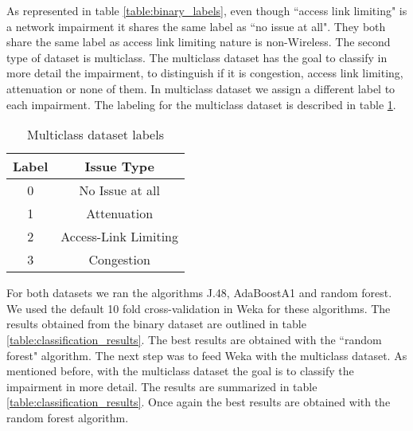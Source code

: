 As represented in table \ref{table:binary_labels}, even though ``access link limiting" is a network impairment it shares the same label as ``no issue at all". They both share the same label as access link limiting nature is non-Wireless.
The second type of dataset is multiclass. The multiclass dataset has the goal to classify in more detail the impairment, to distinguish if it is congestion, access link limiting, attenuation or none of them. In multiclass dataset we assign a different label to each impairment. The labeling for the multiclass dataset is described in table \ref{table:multiclass_labels}.

\begin{table}[H]
	\begin{center}
		\begin{tabular}{||c c||} 
			\hline
			Label & Issue Type\\ [0.5ex] 
			\hline\hline
			0 & No Issue at all \\ 
			\hline
			1 & Attenuation\\
			\hline
			2 & Access-Link Limiting \\
			\hline
			3 & Congestion \\[1ex] 
			\hline
		\end{tabular}
		\caption{Multiclass dataset labels}
		\label{table:multiclass_labels}
	\end{center}
\end{table}

For both datasets we ran the algorithms J.48, AdaBoostA1 and random forest. We used the default 10 fold cross-validation in Weka for these algorithms. The results obtained from the binary dataset are outlined in table \ref{table:classification_results}. The best results are obtained with the ``random forest" algorithm. The next step was to feed Weka with the multiclass dataset. As mentioned before, with the multiclass dataset the goal is to classify the impairment in more detail. The results are summarized in table \ref{table:classification_results}. Once again the best results are obtained with the random forest algorithm.



